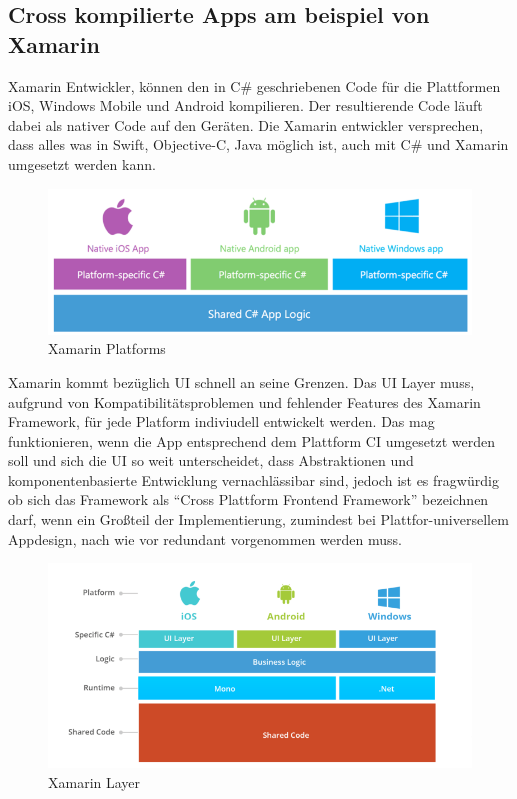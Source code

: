 \subsection{Cross kompilierte Apps am beispiel von Xamarin}

Xamarin Entwickler, können den in C\# geschriebenen Code für die Plattformen iOS, Windows Mobile und Android kompilieren.
Der resultierende Code läuft dabei als nativer Code auf den Geräten.
Die Xamarin entwickler versprechen, dass alles was in Swift, Objective-C, Java möglich ist, auch mit C\# und Xamarin umgesetzt werden kann.\cite{projectxamarin}

\begin{figure}[ht]
 \centering
 \includegraphics[width=0.9\linewidth]{kapitel2/csharp_xamarin.png}
 \caption{Xamarin Platforms \cite{7Reas20:online}}
\end{figure}
\vspace{1cm}

Xamarin kommt bezüglich \ac{UI} schnell an seine Grenzen. Das \ac{UI} Layer muss, aufgrund von Kompatibilitätsproblemen und fehlender Features des Xamarin Framework,
für jede Platform indiviudell entwickelt werden. Das mag funktionieren, wenn die App entsprechend dem Plattform CI umgesetzt werden soll und sich die \ac{UI} so weit unterscheidet,
dass Abstraktionen und komponentenbasierte Entwicklung vernachlässibar sind, jedoch ist es fragwürdig ob sich das Framework als ``Cross Plattform Frontend Framework'' bezeichnen darf,
wenn ein Großteil der Implementierung, zumindest bei Plattfor-universellem Appdesign, nach wie vor redundant vorgenommen werden muss.\cite{7Reas20:online}

\begin{figure}[ht]
 \centering
 \includegraphics[width=0.8\linewidth]{kapitel2/xamarin_ui_blocker.png}
 \caption{Xamarin Layer \cite{7Reas20:online}}
\end{figure}


